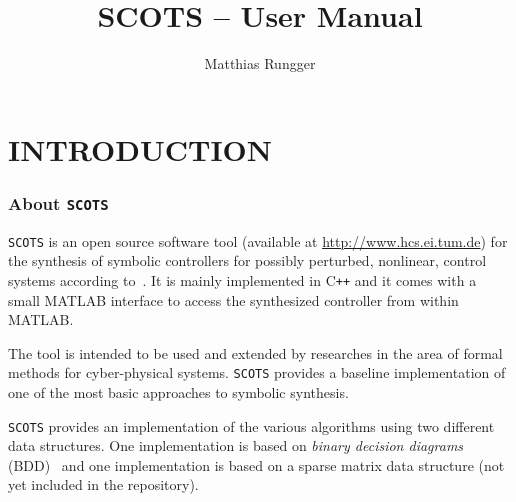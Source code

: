 \documentclass[a4paper]{amsart}
\title{SCOTS -- User Manual}
\author{Matthias Rungger}
\newcommand\Cpp{C\texttt{++} }
\begin{document}
  \maketitle

	\tableofcontents
	\newpage
	

 

\part{INTRODUCTION}


\section{About {\tt SCOTS}}

{\tt SCOTS} is an open source software tool (available at
\mbox{\url{http://www.hcs.ei.tum.de}}) for the synthesis of 
symbolic controllers for possibly perturbed, nonlinear, control systems
according to~\cite{ReissigWeberRungger15}. It is mainly implemented
in \Cpp and it comes with a small MATLAB interface to access the synthesized controller
from within MATLAB. 


The tool is intended to be used and extended by researches in the area of formal methods for
cyber-physical systems. {\tt SCOTS} provides a baseline implementation of one of the most
basic approaches to symbolic synthesis. 

{\tt SCOTS} provides an implementation of the various algorithms using two
different data structures. One implementation is based on \emph{binary decision
diagrams} (BDD)~\cite{Bryant92} and one implementation is based on a sparse
matrix data structure {\color{red} (not yet included in the repository)}. 
\end{document}
